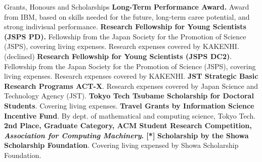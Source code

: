 \begin{rubric}{Grants, Honours and Scholarships}
  \entry*[2023] \textbf{Long-Term Performance Award.}
  Award from IBM, based on skills needed for the future, long-term caree potential, and strong indivisual performance.
  \entry*[2023] \textbf{Research Fellowship for Young Scientists (JSPS PD).}
  Fellowship from the Japan Society for the Promotion of Science (JSPS), covering
  living expenses. Research expenses covered by KAKENHI. (declined)
  \entry*[2021] \textbf{Research Fellowship for Young Scientists (JSPS DC2)}.
  Fellowship from the Japan Society for the Promotion of Science (JSPS), covering
  living expenses. Research expenses covered by KAKENHI.
  \entry*[2020] \textbf{JST Strategic Basic Research Programs ACT-X}. Research
  expenses covered by Japan Science and Technology Agency (JST).
  \entry*[2020] \textbf{Tokyo Tech Tsubame Scholarship for Doctoral
    Students}. Covering living expenses.
  \entry*[2019] \textbf{Travel Grants by Information Science Incentive Fund}. By
  dept. of mathematical and computing science, Tokyo Tech.
  \entry*[2019] \textbf{2nd Place, Graduate Category, ACM Student Research
    Competition, \textit{Association for Computing Machinery}. [*]}
  \entry*[2014] \textbf{Scholarship by the Showa Scholarship Foundation}. Covering
  living expensed by Showa Scholarship Foundation.
\end{rubric}
